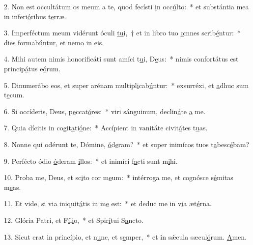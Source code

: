 2. Non est occultátum os meum a te, quod fecísti \uline{i}n occ\uline{ú}lto:~* et substántia mea in inferi\uline{ó}ribus t\uline{e}rræ.\par 
3. Imperféctum meum vidérunt óculi \uline{tu}i,~† et in libro tuo \uline{o}mnes scrib\uline{é}ntur:~* dies formabúntur, et n\uline{e}mo in \uline{e}is.\par 
4. Mihi autem nimis honorificáti sunt amíci t\uline{u}i, D\uline{e}us:~* nimis confortátus est princip\uline{á}tus e\uline{ó}rum.\par 
5. Dinumerábo eos, et super arénam multipl\uline{i}cab\uline{ú}ntur:~* exsurréxi, et \uline{a}dhuc sum t\uline{e}cum.\par 
6. Si occíderis, Deus, p\uline{e}ccat\uline{ó}res:~* viri sánguinum, declin\uline{á}te \uline{a} me.\par 
7. Quia dícitis in cogit\uline{a}ti\uline{ó}ne:~* Accípient in vanitáte civit\uline{á}tes t\uline{u}as.\par 
8. Nonne qui odérunt te, Dómine, \uline{ó}d\uline{e}ram?~* et super inimícos tuos t\uline{a}besc\uline{é}bam?\par 
9. Perfécto ódio \uline{ó}deram \uline{i}llos:~* et inimíci f\uline{a}cti sunt m\uline{i}hi.\par 
10. Proba me, Deus, et sc\uline{i}to cor m\uline{e}um:~* intérroga me, et cognósce s\uline{é}mitas m\uline{e}as.\par 
11. Et vide, si via iniquit\uline{á}tis in m\uline{e} est:~* et deduc me in v\uline{i}a æt\uline{é}rna.\par 
12. Glória Patri, et F\uline{í}l\uline{i}o,~* et Spir\uline{í}tui S\uline{a}ncto.\par 
13. Sicut erat in princípio, et n\uline{u}nc, et s\uline{e}mper,~* et in sǽcula sæcul\uline{ó}rum. \uline{A}men.\par 
